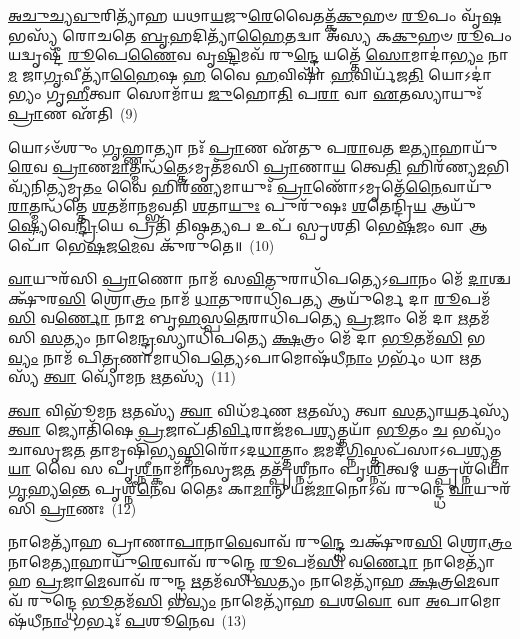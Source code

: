 \-\ul{𑌅}\-\-\ul{𑌚𑍁}\-\-\ul{𑌚𑍍𑌯}\-\-\ul{𑌵𑍁}\-𑌰𑌿𑌤𑍍𑌯𑌾᳴𑌹 𑌯𑌥𑌾\-\ul{𑌯}\-𑌜𑍁\-\ul{𑌰𑍇}\-𑌵𑍈𑌤𑌤𑍍𑌕᳴\-\ul{𑌕𑍁}\-𑌹𑍞 \ul{𑌰𑍂}\-𑌪𑌂 𑌵𑍃᳴\-\ul{𑌷}\-𑌭𑌸𑍍𑌯᳴ 𑌰𑍋𑌚𑌤𑍇 \ul{𑌬𑍃}\-𑌹𑌦𑌿𑌤𑍍𑌯𑌾᳴\-\ul{𑌹𑍈}\-𑌤𑌦𑍍𑌵𑌾 𑌅᳴𑌸𑍍𑌯 𑌕\-\ul{𑌕𑍁}\-𑌹𑍞 \ul{𑌰𑍂}\-𑌪𑌂 𑌯𑌦𑍍𑌵𑍃𑌷𑍍𑌟𑍀᳴ \ul{𑌰𑍂}\-𑌪𑍇\-\ul{𑌣𑍈}\-𑌵 𑌵𑍃\-\ul{𑌷𑍍𑌟𑌿}\-𑌮𑌵᳴ 𑌰𑍁\-\ul{𑌨𑍍𑌦𑍍𑌧𑍇} 𑌯𑌤𑍍𑌤𑍇᳴ \ul{𑌸𑍋}\-𑌮𑌾𑌦𑌾॑\-\ul{𑌭𑍍𑌯𑌂} 𑌨𑌾\-\ul{𑌮} 𑌜𑌾\-\ul{𑌗𑍃}\-𑌵𑍀𑌤𑍍𑌯𑌾᳴\-\ul{𑌹𑍈}\-𑌷 \ul{𑌹} 𑌵𑍈 \ul{𑌹}\-𑌵𑌿𑌷𑌾᳴ \ul{𑌹}\-𑌵𑌿𑌰𑍍𑌯᳴𑌜\-\ul{𑌤𑌿} 𑌯𑍋\-𑌽𑌦𑌾॑𑌭𑍍𑌯𑌂 𑌗𑍃\-\ul{𑌹𑍀}\-𑌤𑍍𑌵𑌾 𑌸𑍋𑌮𑌾᳴𑌯 \ul{𑌜𑍁}\-𑌹𑍋\-\ul{𑌤𑌿} 𑌪\-\ul{𑌰𑌾} 𑌵𑌾 \ul{𑌏}\-𑌤𑌸𑍍𑌯𑌾𑌯𑍁𑌃᳴ \ul{𑌪𑍍𑌰𑌾}\-𑌣 𑌏᳴𑌤𑌿~(9)

𑌯𑍋\-𑌽𑍞᳴𑌶𑍁𑌂 \ul{𑌗𑍃}\-𑌹𑍍𑌣𑌾𑌤𑍍𑌯𑌾 𑌨𑌃᳴ \ul{𑌪𑍍𑌰𑌾}\-𑌣 𑌏᳴𑌤𑍁 𑌪\-\ul{𑌰𑌾}\-𑌵\-\ul{𑌤} 𑌇\-\ul{𑌤𑍍𑌯𑌾}\-𑌹𑌾𑌯𑍁᳴\-\ul{𑌰𑍇}\-𑌵 \ul{𑌪𑍍𑌰𑌾}\-𑌣\-\ul{𑌮𑌾}\-𑌤𑍍𑌮𑌨𑍍𑌧᳴\-\ul{𑌤𑍍𑌤𑍇}\-\-𑌽𑌮𑍃𑌤᳴𑌮𑌸𑌿 \ul{𑌪𑍍𑌰𑌾}\-𑌣𑌾\-\ul{𑌯} 𑌤𑍍𑌵𑍇\-\ul{𑌤𑌿} 𑌹𑌿𑌰᳴𑌣𑍍𑌯\-\ul{𑌮}\-𑌭𑌿 𑌵𑍍𑌯᳴𑌨𑌿\-\ul{𑌤𑍍𑌯}\-𑌮𑍃\-\ul{𑌤𑌂} 𑌵𑍈 𑌹𑌿𑌰᳴\-\ul{𑌣𑍍𑌯}\-𑌮𑌾𑌯𑍁𑌃᳴ \ul{𑌪𑍍𑌰𑌾}\-𑌣𑍋᳴\-𑌽𑌮𑍃𑌤𑍇᳴\-\ul{𑌨𑍈}\-𑌵𑌾𑌯𑍁᳴\-\ul{𑌰𑌾}\-𑌤𑍍𑌮𑌨𑍍𑌧᳴𑌤𑍍𑌤𑍇 \ul{𑌶}\-𑌤𑌮𑌾᳴𑌨𑌮𑍍𑌭𑌵𑌤𑌿 \ul{𑌶}\-𑌤𑌾\-\ul{𑌯𑍁𑌃} 𑌪𑍁𑌰𑍁᳴𑌷𑌃 \ul{𑌶}\-𑌤𑍇𑌨𑍍𑌦𑍍𑌰𑌿᳴\-\ul{𑌯} 𑌆𑌯𑍁᳴\-\ul{𑌷𑍍𑌯𑍇}\-𑌵𑍇\-\ul{𑌨𑍍𑌦𑍍𑌰𑌿}\-𑌯𑍇 𑌪𑍍𑌰𑌤𑌿᳴ 𑌤𑌿𑌷𑍍𑌠\-\ul{𑌤𑍍𑌯}\-𑌪 𑌉𑌪᳴ 𑌸𑍍𑌪𑍃𑌶𑌤𑌿 𑌭𑍇\-\ul{𑌷}\-𑌜𑌂 𑌵𑌾 𑌆𑌪𑍋᳴ 𑌭𑍇\-\ul{𑌷}\-𑌜\-\ul{𑌮𑍇}\-𑌵 𑌕𑍁᳴𑌰𑍁𑌤𑍇॥~(10)

{\anuvakamend[{\-\ul{𑌉}\-𑌗𑍍𑌰𑌾 \ul{𑌏}\-𑌤𑍍𑌯𑌾\-\ul{𑌪}\-𑌸𑍍𑌤𑍍𑌰𑍀𑌣𑌿᳴ 𑌚}]}%

\-\ul{𑌵𑌾}\-𑌯𑍁𑌰᳴𑌸𑌿 \ul{𑌪𑍍𑌰𑌾}\-𑌣𑍋 𑌨𑌾𑌮᳴ 𑌸\-\ul{𑌵𑌿}\-𑌤𑍁𑌰𑌾𑌧𑌿᳴𑌪𑌤𑍍𑌯𑍇\-𑌽\-\ul{𑌪𑌾}\-𑌨𑌂 𑌮𑍇᳴ \ul{𑌦𑌾}\-𑌶𑍍𑌚𑌕𑍍𑌷𑍁᳴𑌰\-\ul{𑌸𑌿} 𑌶𑍍𑌰𑍋\-\ul{𑌤𑍍𑌰𑌂} 𑌨𑌾𑌮᳴ \ul{𑌧𑌾}\-𑌤𑍁𑌰𑌾𑌧𑌿᳴𑌪\-\ul{𑌤𑍍𑌯} 𑌆𑌯𑍁᳴𑌰𑍍𑌮𑍇 𑌦𑌾 \ul{𑌰𑍂}\-𑌪𑌮᳴\-\ul{𑌸𑌿} 𑌵\-\ul{𑌰𑍍𑌣𑍋} 𑌨𑌾\-\ul{𑌮} 𑌬𑍃\-\ul{𑌹}\-𑌸𑍍𑌪\-\ul{𑌤𑍇}\-𑌰𑌾𑌧𑌿᳴𑌪𑌤𑍍𑌯𑍇 \ul{𑌪𑍍𑌰}\-𑌜𑌾𑌂 𑌮𑍇᳴ 𑌦𑌾 \ul{𑌋}\-𑌤𑌮᳴𑌸𑌿 \ul{𑌸}\-𑌤𑍍𑌯𑌂 𑌨𑌾𑌮𑍇\-\ul{𑌨𑍍𑌦𑍍𑌰}\-𑌸𑍍𑌯𑌾𑌧𑌿᳴𑌪𑌤𑍍𑌯𑍇 \ul{𑌕𑍍𑌷}\-𑌤𑍍𑌰𑌂 𑌮𑍇᳴ 𑌦𑌾 \ul{𑌭𑍂}\-𑌤𑌮᳴\-\ul{𑌸𑌿} 𑌭\-\ul{𑌵𑍍𑌯𑌂} 𑌨𑌾𑌮᳴ 𑌪𑌿\-\ul{𑌤𑍃}\-𑌣𑌾𑌮𑌾𑌧𑌿᳴𑌪\-\ul{𑌤𑍍𑌯𑍇}\-\-𑌽𑌪𑌾𑌮𑍋𑌷᳴𑌧𑍀\-\ul{𑌨𑌾𑌂} 𑌗𑌰𑍍𑌭𑌂᳴ 𑌧𑌾 \ul{𑌋}\-𑌤𑌸𑍍𑌯᳴ \ul{𑌤𑍍𑌵𑌾} 𑌵𑍍𑌯𑍋᳴𑌮𑌨 \ul{𑌋}\-𑌤𑌸𑍍𑌯᳴~(11)

\-\ul{𑌤𑍍𑌵𑌾} 𑌵𑌿𑌭𑍂᳴𑌮𑌨 \ul{𑌋}\-𑌤𑌸𑍍𑌯᳴ \ul{𑌤𑍍𑌵𑌾} 𑌵𑌿𑌧᳴𑌰𑍍𑌮𑌣 \ul{𑌋}\-𑌤𑌸𑍍𑌯᳴ 𑌤𑍍𑌵𑌾 \ul{𑌸}\-𑌤𑍍𑌯𑌾\-\ul{𑌯}\-𑌰𑍍𑌤𑌸𑍍𑌯᳴ \ul{𑌤𑍍𑌵𑌾} 𑌜𑍍𑌯𑍋𑌤𑌿᳴𑌷𑍇 \ul{𑌪𑍍𑌰}\-𑌜𑌾𑌪᳴𑌤𑌿\-\ul{𑌰𑍍𑌵𑌿}\-𑌰𑌾𑌜᳴𑌮𑌪\-\ul{𑌶𑍍𑌯}\-𑌤𑍍𑌤𑌯𑌾᳴ \ul{𑌭𑍂}\-𑌤𑌂 \ul{𑌚} 𑌭𑌵𑍍𑌯𑌂᳴ 𑌚𑌾𑌸𑍃𑌜\-\ul{𑌤} 𑌤𑌾𑌮𑍃𑌷𑌿᳴𑌭𑍍𑌯\-\ul{𑌸𑍍𑌤𑌿}\-𑌰𑍋᳴\-𑌽𑌦\-\ul{𑌧𑌾}\-𑌤𑍍𑌤𑌾𑌂 \ul{𑌜}\-𑌮𑌦᳴\-\ul{𑌗𑍍𑌨𑌿}\-𑌸𑍍𑌤𑌪᳴𑌸𑌾\-𑌽𑌪\-\ul{𑌶𑍍𑌯}\-𑌤𑍍𑌤\-\ul{𑌯𑌾} 𑌵𑍈 𑌸 𑌪𑍃\-\ul{𑌶𑍍𑌨𑍀}\-𑌨𑍍𑌕𑌾𑌮𑌾᳴𑌨𑌸𑍃𑌜\-\ul{𑌤} 𑌤𑌤𑍍𑌪𑍃᳴𑌶𑍍𑌨𑍀𑌨𑌾𑌂 𑌪𑍃\-\ul{𑌶𑍍𑌨𑌿}\-𑌤𑍍𑌵𑌮𑍍 𑌯𑌤𑍍𑌪𑍃𑌶𑍍𑌨᳴𑌯𑍋 \ul{𑌗𑍃}\-𑌹𑍍𑌯\-\ul{𑌨𑍍𑌤𑍇} 𑌪𑍃𑌶𑍍𑌨𑍀᳴\-\ul{𑌨𑍇}\-𑌵 𑌤𑍈𑌃 𑌕𑌾\-\ul{𑌮𑌾}\-𑌨𑍍 𑌯𑌜᳴\-\ul{𑌮𑌾}\-𑌨𑍋\-𑌽𑌵᳴ 𑌰𑍁𑌨𑍍𑌦𑍍𑌧𑍇 \ul{𑌵𑌾}\-𑌯𑍁𑌰᳴𑌸𑌿 \ul{𑌪𑍍𑌰𑌾}\-𑌣𑌃~(12)

𑌨𑌾𑌮𑍇𑌤𑍍𑌯𑌾᳴𑌹 𑌪𑍍𑌰𑌾𑌣𑌾\-\ul{𑌪𑌾}\-𑌨𑌾\-\ul{𑌵𑍇}\-𑌵𑌾𑌵᳴ 𑌰𑍁\-\ul{𑌨𑍍𑌦𑍍𑌧𑍇} 𑌚𑌕𑍍𑌷𑍁᳴𑌰\-\ul{𑌸𑌿} 𑌶𑍍𑌰𑍋\-\ul{𑌤𑍍𑌰𑌂} 𑌨𑌾𑌮𑍇\-\ul{𑌤𑍍𑌯𑌾}\-𑌹𑌾𑌯𑍁᳴\-\ul{𑌰𑍇}\-𑌵𑌾𑌵᳴ 𑌰𑍁𑌨𑍍𑌦𑍍𑌧𑍇 \ul{𑌰𑍂}\-𑌪𑌮᳴\-\ul{𑌸𑌿} 𑌵\-\ul{𑌰𑍍𑌣𑍋} 𑌨𑌾𑌮𑍇𑌤𑍍𑌯𑌾᳴𑌹 \ul{𑌪𑍍𑌰}\-𑌜𑌾\-\ul{𑌮𑍇}\-𑌵𑌾𑌵᳴ 𑌰𑍁𑌨𑍍𑌦𑍍𑌧 \ul{𑌋}\-𑌤𑌮᳴𑌸𑌿 \ul{𑌸}\-𑌤𑍍𑌯𑌂 𑌨𑌾𑌮𑍇𑌤𑍍𑌯𑌾᳴𑌹 \ul{𑌕𑍍𑌷}\-𑌤𑍍𑌰\-\ul{𑌮𑍇}\-𑌵𑌾𑌵᳴ 𑌰𑍁𑌨𑍍𑌦𑍍𑌧𑍇 \ul{𑌭𑍂}\-𑌤𑌮᳴\-\ul{𑌸𑌿} 𑌭\-\ul{𑌵𑍍𑌯𑌂} 𑌨𑌾𑌮𑍇𑌤𑍍𑌯𑌾᳴𑌹 \ul{𑌪}\-𑌶\-\ul{𑌵𑍋} 𑌵𑌾 \ul{𑌅}\-𑌪𑌾𑌮𑍋𑌷᳴𑌧𑍀\-\ul{𑌨𑌾𑌂} 𑌗𑌰𑍍𑌭𑌃᳴ \ul{𑌪}\-𑌶𑍂\-\ul{𑌨𑍇}\-𑌵~(13)

